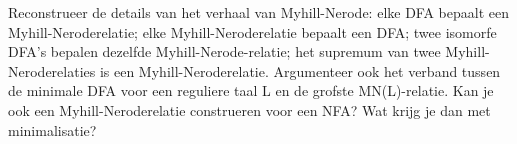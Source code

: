 \begin{question}
Reconstrueer de details van het verhaal van Myhill-Nerode: elke DFA bepaalt een Myhill-Neroderelatie; elke Myhill-Neroderelatie bepaalt een DFA; twee isomorfe DFA's bepalen dezelfde Myhill-Nerode-relatie; het supremum van twee Myhill-Neroderelaties is een Myhill-Neroderelatie.
Argumenteer ook het verband tussen de minimale DFA voor een reguliere taal L en de grofste MN(L)-relatie.
Kan je ook een Myhill-Neroderelatie construeren voor een NFA? Wat krijg je dan met minimalisatie?
\end{question}
